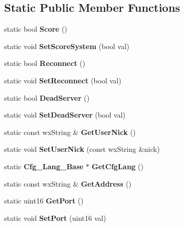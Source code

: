 \subsection*{Static Public Member Functions}
\begin{DoxyCompactItemize}
\item 
static bool {\bfseries Score} ()\label{classCPreferences_a403950e0a22e345e195516692a5b7036}

\item 
static void {\bfseries SetScoreSystem} (bool val)\label{classCPreferences_af17cb0ade438bd2266e350056333820b}

\item 
static bool {\bfseries Reconnect} ()\label{classCPreferences_af8d2d24270f6d00007fb063ea35c6f13}

\item 
static void {\bfseries SetReconnect} (bool val)\label{classCPreferences_ad863a3a365124df91c2809ed60331ddb}

\item 
static bool {\bfseries DeadServer} ()\label{classCPreferences_ab763e5a97772d39480e897a3d3a94626}

\item 
static void {\bfseries SetDeadServer} (bool val)\label{classCPreferences_a237b7d5f3998a4e098d043815916a571}

\item 
static const wxString \& {\bfseries GetUserNick} ()\label{classCPreferences_ac371946b4d4cf3ea76387dbfb8bba011}

\item 
static void {\bfseries SetUserNick} (const wxString \&nick)\label{classCPreferences_a943f6d54fc13c5330b47bcc67ac42fde}

\item 
static {\bf Cfg\_\-Lang\_\-Base} $\ast$ {\bfseries GetCfgLang} ()\label{classCPreferences_a7b82416d442bc0a55754ffbd43d1c954}

\item 
static const wxString \& {\bfseries GetAddress} ()\label{classCPreferences_a0f73bf5263d9d73a132b408f3b23a192}

\item 
static uint16 {\bfseries GetPort} ()\label{classCPreferences_ac9661a958045a0fced85639f20c157d0}

\item 
static void {\bfseries SetPort} (uint16 val)\label{classCPreferences_afa5508ebc938cbe2547cabb4413eb26f}


\end{DoxyCompactItemize}
